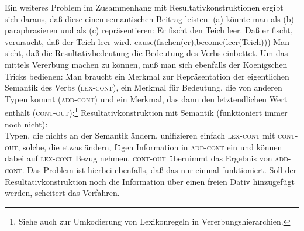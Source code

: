 Ein weiteres Problem im Zusammenhang mit Resultativkonstruktionen ergibt sich daraus, daß
diese einen semantischen Beitrag leisten. (a) könnte man als (b) paraphrasieren
und als (c) repräsentieren:
\eal
\ex Er fischt den Teich leer.
\ex Daß er fischt, verursacht, daß der Teich leer wird.
\ex cause(fischen(er),become(leer(Teich)))
\zl
Man sieht, daß die Resultativbedeutung die Bedeutung des Verbs einbettet. Um das mittels Vererbung
machen zu können, muß man sich ebenfalls der Koenigschen Tricks bedienen: Man braucht ein Merkmal
zur Repräsentation der eigentlichen Semantik des Verbs (\textsc{lex-cont}), ein Merkmal für
Bedeutung, die von anderen Typen kommt (\textsc{add-cont}) und ein Merkmal, das dann den letztendlichen
Wert enthält (\textsc{cont-out}):\footnote{
  Siehe auch  zur Umkodierung von Lexikonregeln in Vererbungshierarchien.
}
\ea
Resultativkonstruktion mit Semantik (funktioniert immer noch nicht):\\
\z
Typen, die nichts an der Semantik ändern, unifizieren einfach \textsc{lex-cont} mit \textsc{cont-out},
solche, die etwas ändern, fügen Information in \textsc{add-cont} ein und können dabei auf \textsc{lex-cont}
Bezug nehmen. \textsc{cont-out} übernimmt das Ergebnis von \textsc{add-cont}. Das Problem ist hierbei ebenfalls,
daß das nur einmal funktioniert. Soll der Resultativkonstruktion noch die Information über einen
freien Dativ hinzugefügt werden, scheitert das Verfahren.


